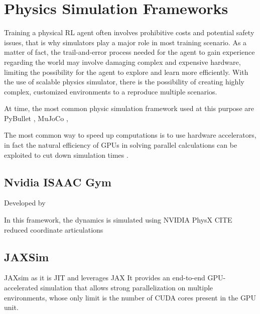 \chapter{Physics Simulation Frameworks}
\label{chp:03-PhysicsSimulators}

Training a physical \ac{RL} agent often involves prohibitive costs and potential safety issues, that is why simulators play a major role in most training scenario. As a matter of fact, the trail-and-error process needed for the agent to gain experience regarding the world may involve damaging complex and expensive hardware, limiting the possibility for the agent to explore and learn more efficiently. 
With the use of scalable physics simulator, there is the possibility of creating highly complex, customized environments to a reproduce multiple scenarios.

At time, the most common physic simulation framework used at this purpose are PyBullet \cite{coumans_pybullet_2016}, MuJoCo \cite{todorov_mujoco_2012}, 

The most common way to speed up computations is to use hardware accelerators, in fact the natural efficiency of \ac{GPU}s in solving parallel calculations can be exploited to cut down simulation times \cite{liang_gpu-accelerated_2018}.  

\section{Nvidia ISAAC Gym}

Developed by \cite{makoviychuk_isaac_2021}

In this framework, the dynamics is simulated using NVIDIA PhysX CITE reduced coordinate articulations
\section{JAXSim}


JAXsim \cite{ferigo_jaxsim_2022} as it is \ac{JIT} and leverages JAX \cite{bradbury_jax_2018}
It provides an end-to-end GPU-accelerated simulation that allows strong parallelization on multiple environments, whose only limit is the number of \ac{CUDA} cores present in the GPU unit. 